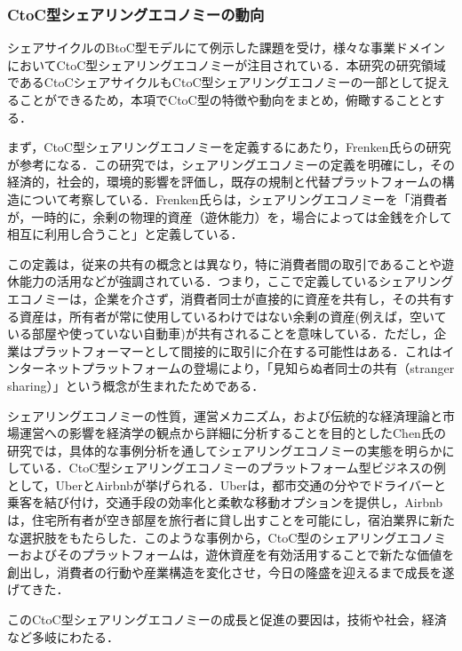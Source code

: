       \subsubsection{CtoC型シェアリングエコノミーの動向}
        \label{sec:CtoC型シェアリングエコノミーの動向}
          \par シェアサイクルのBtoC型モデルにて例示した課題を受け，様々な事業ドメインにおいてCtoC型シェアリングエコノミーが注目されている．本研究の研究領域であるCtoCシェアサイクルもCtoC型シェアリングエコノミーの一部として捉えることができるため，本項でCtoC型の特徴や動向をまとめ，俯瞰することとする．
          \par まず，CtoC型シェアリングエコノミーを定義するにあたり，Frenken氏らの研究 が参考になる．この研究では，シェアリングエコノミーの定義を明確にし，その経済的，社会的，環境的影響を評価し，既存の規制と代替プラットフォームの構造について考察している．Frenken氏らは，シェアリングエコノミーを「消費者が，一時的に，余剰の物理的資産（遊休能力）を，場合によっては金銭を介して相互に利用し合うこと」と定義している．
          \par この定義は，従来の共有の概念とは異なり，特に消費者間の取引であることや遊休能力の活用などが強調されている．つまり，ここで定義しているシェアリングエコノミーは，企業を介さず，消費者同士が直接的に資産を共有し，その共有する資産は，所有者が常に使用しているわけではない余剰の資産(例えば，空いている部屋や使っていない自動車)が共有されることを意味している．ただし，企業はプラットフォーマーとして間接的に取引に介在する可能性はある．これはインターネットプラットフォームの登場により，「見知らぬ者同士の共有（stranger sharing）」という概念が生まれたためである．
          \par シェアリングエコノミーの性質，運営メカニズム，および伝統的な経済理論と市場運営への影響を経済学の観点から詳細に分析することを目的としたChen氏の研究では，具体的な事例分析を通してシェアリングエコノミーの実態を明らかにしている．CtoC型シェアリングエコノミーのプラットフォーム型ビジネスの例として，UberとAirbnbが挙げられる．Uberは，都市交通の分やでドライバーと乗客を結び付け，交通手段の効率化と柔軟な移動オプションを提供し，Airbnbは，住宅所有者が空き部屋を旅行者に貸し出すことを可能にし，宿泊業界に新たな選択肢をもたらした．このような事例から，CtoC型のシェアリングエコノミーおよびそのプラットフォームは，遊休資産を有効活用することで新たな価値を創出し，消費者の行動や産業構造を変化させ，今日の隆盛を迎えるまで成長を遂げてきた．
          \par このCtoC型シェアリングエコノミーの成長と促進の要因は，技術や社会，経済など多岐にわたる．
